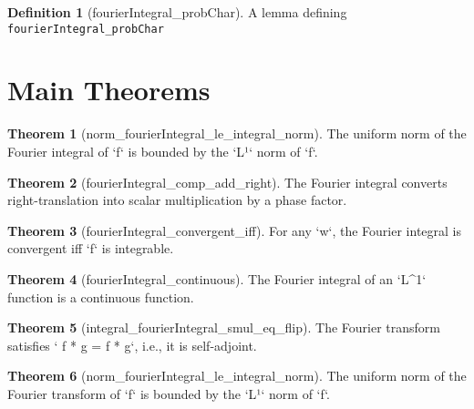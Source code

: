 \documentclass{article}
\theoremstyle{definition}
\newtheorem{definition}{Definition}
\newtheorem{theorem}{Theorem}
\begin{document}
\begin{definition}[fourierIntegral_probChar]
A lemma defining \texttt{fourierIntegral_probChar}
\end{definition}

\section{Main Theorems}
\begin{theorem}[norm_fourierIntegral_le_integral_norm]
The uniform norm of the Fourier integral of `f` is bounded by the `L¹` norm of `f`.
\end{theorem}

\begin{theorem}[fourierIntegral_comp_add_right]
The Fourier integral converts right-translation into scalar multiplication by a phase factor.
\end{theorem}

\begin{theorem}[fourierIntegral_convergent_iff]
For any `w`, the Fourier integral is convergent iff `f` is integrable.
\end{theorem}

\begin{theorem}[fourierIntegral_continuous]
The Fourier integral of an `L^1` function is a continuous function.
\end{theorem}

\begin{theorem}[integral_fourierIntegral_smul_eq_flip]
The Fourier transform satisfies `\int {} f * g = \int f *  g`, i.e., it is self-adjoint.
\end{theorem}

\begin{theorem}[norm_fourierIntegral_le_integral_norm]
The uniform norm of the Fourier transform of `f` is bounded by the `L¹` norm of `f`.
\end{theorem}
\end{document}
